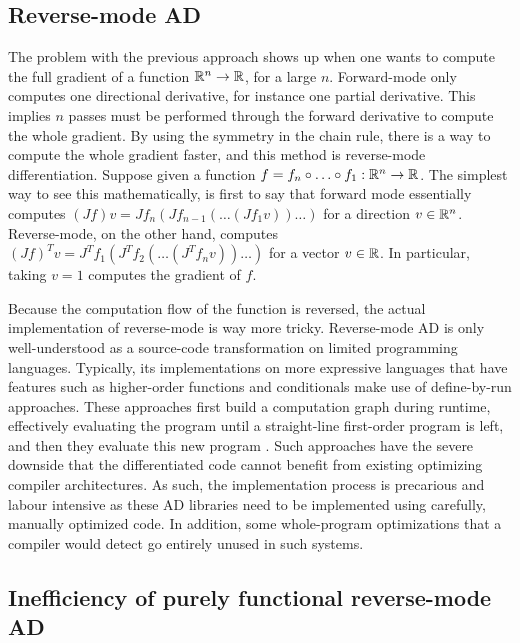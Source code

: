 
\subsection{Reverse-mode AD}

The problem with the previous approach shows up when one wants to compute the full gradient of a function $\mathbb{R}^n\to\mathbb{R}$, for a large $n$. 
Forward-mode only computes one directional derivative, for instance one partial derivative. 
This implies $n$ passes must be performed through the forward derivative to compute the whole gradient.
By using the symmetry in the chain rule, there is a way to compute the whole gradient faster, and this method is reverse-mode differentiation.
Suppose given a function $f=f_n\circ\ldots\circ f_1 :\mathbb{R}^n\to\mathbb{R}$. 
The simplest way to see this mathematically, is first to say that forward mode essentially computes $(Jf)v=Jf_n(Jf_{n-1}(\ldots(Jf_1v))\ldots)$ for a direction $v\in\mathbb{R}^n$. 
Reverse-mode, on the other hand, computes $(Jf)^Tv =J^Tf_1(J^Tf_{2}(\ldots(J^Tf_nv))\ldots)$ for a vector $v\in\mathbb{R}$.
In particular, taking $v=1$ computes the gradient of $f$.

Because the computation flow of the function is reversed, the actual implementation of reverse-mode is way more tricky. 
Reverse-mode AD is only well-understood as a source-code transformation on limited programming languages. 
Typically, its implementations on more expressive languages that have features such as higher-order functions and conditionals
make use of define-by-run approaches. These approaches first build a computation graph during runtime, effectively evaluating the program until a straight-line
first-order program is left, and then they evaluate this new program \cite{carpenter2015stan,paszke2017automatic}. 
Such approaches have the severe downside that the differentiated code cannot benefit from existing optimizing compiler architectures. 
As such, the implementation process is precarious and labour intensive as these AD libraries need to be implemented using carefully, manually optimized code.
In addition, some whole-program optimizations that a compiler would detect go entirely unused in such systems.

\subsection{Inefficiency of purely functional reverse-mode AD}

